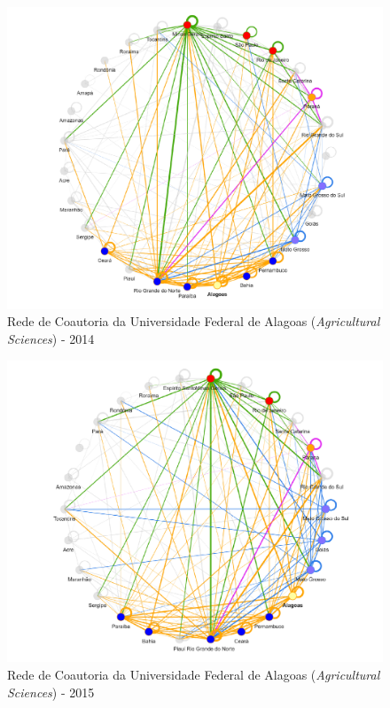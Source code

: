 \begin{figure}[H]
	\centering
	\includegraphics[width=\linewidth]{Imagens/rede-agr-AL-2014.pdf}
	\caption{Rede de Coautoria da Universidade Federal de Alagoas (\textit{Agricultural Sciences}) - 2014}
	\label{Rede de Coautoria - UF AGRI AL 2014}
\end{figure}


\begin{figure}[H]
	\centering
	\includegraphics[width=\linewidth]{Imagens/rede-agr-AL-2015.pdf}
	\caption{Rede de Coautoria da Universidade Federal de Alagoas (\textit{Agricultural Sciences}) - 2015}
	\label{Rede de Coautoria - UF AGRI AL 2015}
\end{figure}


